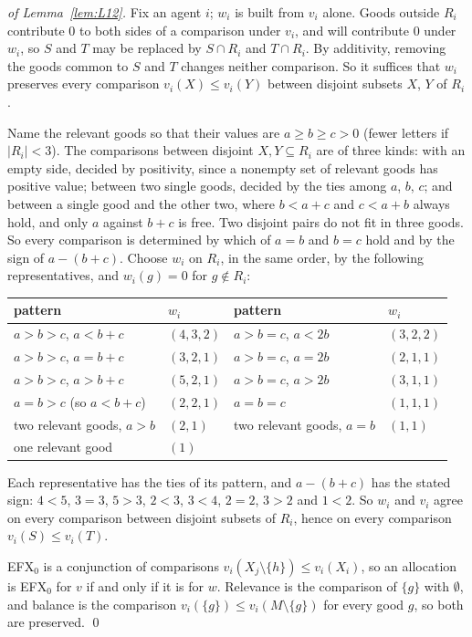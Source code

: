 \documentclass[runningheads,11pt]{llncs}
\newcommand{\efxz}{\texorpdfstring{\mbox{EFX$_0$}}{EFX0}}
\begin{document}
\begin{proof}[of Lemma~\ref{lem:L12}]
Fix an agent $i$; $w_i$ is built from $v_i$ alone. Goods outside $R_i$ contribute $0$ to both sides of a comparison under $v_i$, and will contribute $0$ under $w_i$, so $S$ and $T$ may be replaced by $S\cap R_i$ and $T\cap R_i$. By additivity, removing the goods common to $S$ and $T$ changes neither comparison. So it suffices that $w_i$ preserves every comparison $v_i(X)\le v_i(Y)$ between disjoint subsets $X$, $Y$ of $R_i$.

Name the relevant goods so that their values are $a\ge b\ge c>0$ (fewer letters if $|R_i|<3$). The comparisons between disjoint $X,Y\subseteq R_i$ are of three kinds: with an empty side, decided by positivity, since a nonempty set of relevant goods has positive value; between two single goods, decided by the ties among $a$, $b$, $c$; and between a single good and the other two, where $b<a+c$ and $c<a+b$ always hold, and only $a$ against $b+c$ is free. Two disjoint pairs do not fit in three goods. So every comparison is determined by which of $a=b$ and $b=c$ hold and by the sign of $a-(b+c)$. Choose $w_i$ on $R_i$, in the same order, by the following representatives, and $w_i(g)=0$ for $g\notin R_i$:
\begin{center}\small
\setlength{\tabcolsep}{4pt}\begin{tabular}{@{}ll@{\qquad}ll@{}}
\toprule
pattern & $w_i$ & pattern & $w_i$ \\
\midrule
$a>b>c$, $a<b+c$ & $(4,3,2)$ & $a>b=c$, $a<2b$ & $(3,2,2)$ \\
$a>b>c$, $a=b+c$ & $(3,2,1)$ & $a>b=c$, $a=2b$ & $(2,1,1)$ \\
$a>b>c$, $a>b+c$ & $(5,2,1)$ & $a>b=c$, $a>2b$ & $(3,1,1)$ \\
$a=b>c$ (so $a<b+c$) & $(2,2,1)$ & $a=b=c$ & $(1,1,1)$ \\
two relevant goods, $a>b$ & $(2,1)$ & two relevant goods, $a=b$ & $(1,1)$ \\
one relevant good & $(1)$ & & \\
\bottomrule
\end{tabular}
\end{center}
Each representative has the ties of its pattern, and $a-(b+c)$ has the stated sign: $4<5$, $3=3$, $5>3$, $2<3$, $3<4$, $2=2$, $3>2$ and $1<2$. So $w_i$ and $v_i$ agree on every comparison between disjoint subsets of $R_i$, hence on every comparison $v_i(S)\le v_i(T)$.

\efxz{} is a conjunction of comparisons $v_i(X_j\setminus\{h\})\le v_i(X_i)$, so an allocation is \efxz{} for $v$ if and only if it is for $w$. Relevance is the comparison of $\{g\}$ with $\emptyset$, and balance is the comparison $v_i(\{g\})\le v_i(M\setminus\{g\})$ for every good $g$, so both are preserved. \qed
\end{proof}
\end{document}
